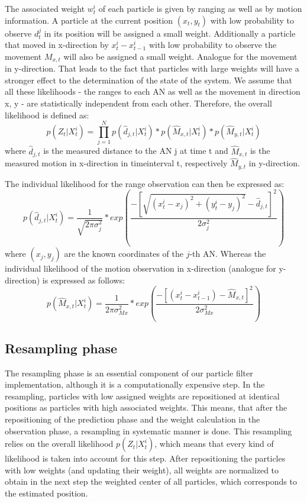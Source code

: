 The associated weight $w^{i}_{t}$ of each particle is given by ranging as well as by motion information. A particle at the current position $(x_{t},y_{t})$ with low probability to observe $d_{t}^{j}$ in its position will be assigned a small weight. Additionally a particle that moved in x-direction by $x_{t}^{i}-x_{t-1}^{i}$ with low probability to observe the movement $M_{x,t}$ will also be assigned a small weight. Analogue for the movement in y-direction.
That leads to the fact that particles with large weights will have a stronger effect to the determination of the state of the system.
We assume that all these likelihoods - the ranges to each AN as well as the movement in direction x, y - are statistically independent from each other. Therefore, the overall likelihood is defined as:
$$p(Z_{t} | X^{i}_{t}) = \prod_{j=1}^{N} p(\hat{d}_{j,t}|X_{t}^{i}) * p(\hat{M}_{x,t} | X^{i}_{t}) * p(\hat{M}_{y,t} | X^{i}_{t})$$
where $\hat{d}_{j,t}$ is the measured distance to the AN j at time t and $\hat{M}_{x,t}$ is the measured motion in x-direction in timeinterval t, respectively $\hat{M}_{y,t}$ in y-direction.  

The individual likelihood for the range observation can then be expressed as:
$$p(\hat{d}_{j,t} | X^{i}_{t}) = \frac{1}{\sqrt{2\pi \sigma_{j}^{2}}} * exp(\frac{-[\sqrt{(x^{i}_{t}-x_{j})^{2}+(y^{i}_{t}-y_{j})^{2}} - \hat{d}_{j,t}]^{2}}{2\sigma_{j}^{2}})$$
where $(x_{j},y_{j})$ are the known coordinates of the $j$-th AN.
Whereas the individual likelihood of the motion observation in x-direction (analogue for y-direction) is expressed as follows:
$$p(\hat{M}_{x,t} | X^{i}_{t}) = \frac{1}{2\pi \sigma_{Mx}^{2}} * exp(\frac{-[(x^{i}_{t}-x^{i}_{t-1}) - \hat{M}_{x,t}]^{2}}{2\sigma_{Mx}^{2}})$$

\subsection{Resampling phase}
The resampling phase is an essential component of our particle filter implementation, although it is a computationally expensive step. In the resampling, particles with low assigned weights are repositioned at identical positions as particles with high associated weights. This means, that after the repositioning of the prediction phase and the weight calculation in the observation phase, a resampling in systematic manner is done. This resampling relies on the overall likelihood $p(Z_{t} | X^{i}_{t})$, which means that every kind of likelihood is taken into account for this step. After repositioning the particles with low weights (and updating their weight), all weights are normalized to obtain in the next step the weighted center of all particles, which corresponds to the estimated position. 
